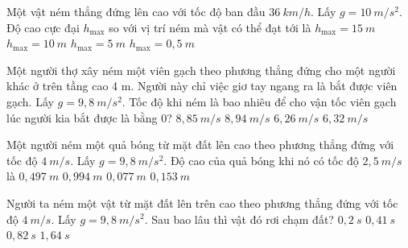 \begin{ex}%
Một vật ném thẳng đứng lên cao với tốc độ  ban đầu $36\ km/h$. Lấy $g=10\ m/s^2$. Độ cao cực đại $h_{\max}$ so với vị trí ném mà vật có thể đạt tới là
\choice
{$h_{\max} = 15\ m$}
{$h_{\max} = 10\ m$}
{\True $h_{\max} = 5\ m$}
{$h_{\max} = 0,5\ m$}
\end{ex}
\begin{ex}%
Một người thợ xây ném một viên gạch theo phương thẳng đứng cho một người khác ở trên tầng cao 4 m. Người này chỉ việc giơ tay ngang ra là bắt được viên gạch. Lấy $g = 9,8\  m/s^ 2$. Tốc độ khi ném là bao nhiêu để cho vận tốc viên gạch lúc người kia bắt được là bằng $0$?
\choice
{\True $8,85\  m/s$}
{$8,94\  m/s$}
{$6,26\  m/s$}
{$6,32\  m/s$}
\end{ex}
\begin{ex}%
Một người ném một quả bóng từ mặt đất lên cao theo phương thẳng đứng với tốc độ $4\  m/s$. Lấy $g = 9,8\  m/s^2$. Độ cao của quả bóng khi nó có tốc độ $2,5\ m/s$ là 
\choice
{\True $0,497\ m$}
{$0,994\ m$}
{$0,077\ m$}
{$0,153\ m$}
\end{ex}
\begin{ex}%
Người ta ném một vật từ mặt đất lên trên cao theo phương thẳng đứng với tốc độ $4\ m/s$. Lấy $g = 9,8\  m/s^2$. Sau bao lâu thì vật đó rơi chạm đất?
\choice
{$0,2\ s$}
{$0,41\ s$}
{\True $0,82\ s$}
{$1,64\ s$}
\end{ex}
